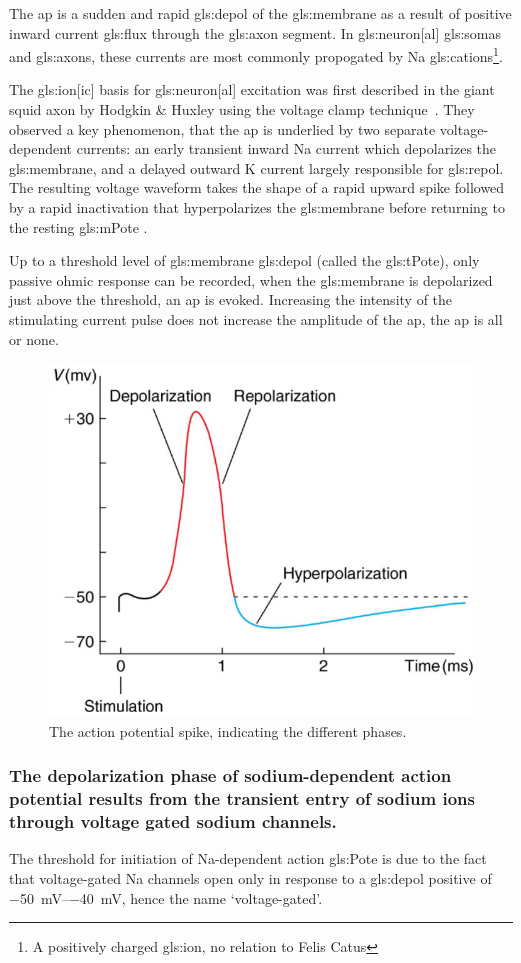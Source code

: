 \documentclass[class={myRUCProject}, crop=false]{standalone}
\begin{document}
The \gls{ap} is a sudden and rapid \gls{gls:depol} of the \gls{gls:membrane} as a result of positive inward current \gls{gls:flux} through the \gls{gls:axon} segment. In \gls{gls:neuron}[al] \glspl{gls:soma} and \glspl{gls:axon}, these currents are most commonly propogated by \gls{Na} \glspl{gls:cation}\footnote{A positively charged \gls{gls:ion}, no relation to Felis Catus}.

The \gls{gls:ion}[ic] basis for \gls{gls:neuron}[al] excitation was first described in the giant squid axon by Hodgkin \& Huxley  using the voltage clamp technique~\cite{HodHux1952}. They observed a key phenomenon, that the \gls{ap} is underlied by two separate voltage-dependent currents: an early transient inward \gls{Na} current which depolarizes the \gls{gls:membrane}, and a delayed outward \gls{K} current largely responsible for \gls{gls:repol}. 
The resulting voltage waveform takes the shape of a rapid upward spike followed by a rapid inactivation that hyperpolarizes the \gls{gls:membrane} before returning to the resting \gls{gls:mPote} .

Up to a threshold level of \gls{gls:membrane} \gls{gls:depol} (called the \gls{gls:tPote}), only passive ohmic response can be recorded, when the \gls{gls:membrane} is depolarized just above the threshold, an \gls{ap} is evoked. 
Increasing the intensity of the stimulating current pulse does not increase the amplitude of the \gls{ap}, the \gls{ap} is all or none. 
\begin{figure}[H]
  \centering
  \includegraphics[width=0.5\linewidth]{Pictures//Anakin/AP.png}
  \caption{The action potential spike, indicating the different phases.}
  \label{fig:AP}
\end{figure}

\subsubsection{The depolarization phase of sodium-dependent action potential results from the transient entry of sodium ions through voltage gated sodium channels.}
The threshold for initiation of \gls{Na}-dependent action \gls{gls:Pote} is due to the fact that voltage-gated \gls{Na} channels open only in response to a \gls{gls:depol} positive of \qtyrange{-50}{-40}{\mV}, hence the name `voltage-gated'. 
\end{document}
